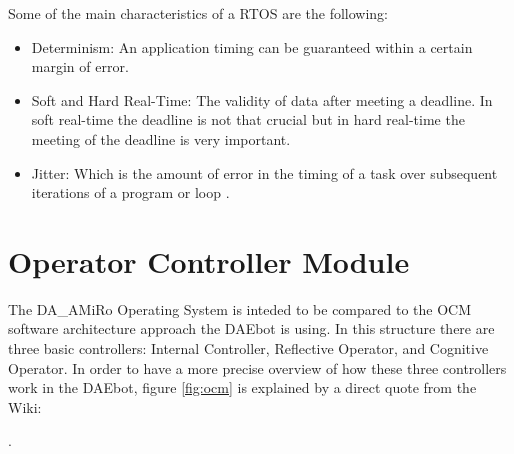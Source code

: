 \documentclass[12pt]{report}%
\begin{document}
Some of the main characteristics of a RTOS are the following:

\begin{itemize}
\item Determinism: An application timing can be guaranteed within a certain margin of error.
\item Soft and Hard Real-Time: The validity of data after meeting a deadline. In soft real-time the deadline is not that crucial but in hard real-time the meeting of the deadline is very important.
\item Jitter: Which is the amount of error in the timing of a task over subsequent iterations of a program or loop \cite{whatisRTOS}.
\end{itemize}

\section{Operator Controller Module}

The DA\_AMiRo Operating System is inteded to be compared to the OCM \cite{ocmAuto} software architecture approach the DAEbot is using. In this structure there are three basic controllers: Internal Controller, Reflective Operator, and Cognitive Operator. In order to have a more precise overview of how these three controllers work in the DAEbot, figure \ref{fig:ocm} is explained by a direct quote from the Wiki:

\cite{DAEbot_Wiki}.
\end{document}
